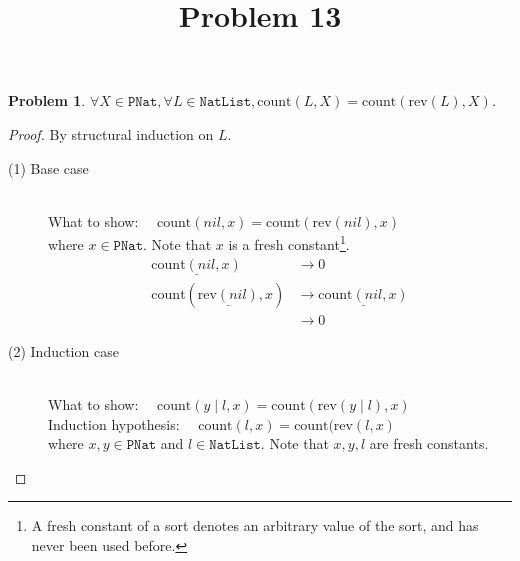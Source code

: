 \documentclass[12pt, a4paper]{article}
\title{Problem 13}
\date{\vspace{-5ex}}
\newtheorem{problem}{Problem}
\newcommand{\rmx}[1]{\mathrm{#1}}
\newcommand{\larrow}{\longrightarrow}
\newcommand{\under}{\underline}
\begin{document}
\maketitle

\begin{problem}
$\forall X \in \mathtt{PNat}, \forall L \in \mathtt{NatList}, \rmx{count}(L, X) = \rmx{count}(\rmx{rev}(L), X)$.
\end{problem}
\begin{proof}
By structural induction on $L$.
\begin{description}
\item[(1) Base case]~\\
\noindent
What to show: $\quad \rmx{count}(nil, x) = \rmx{count}(\rmx{rev}(nil), x)$\\
where $x \in \mathtt{PNat}$. Note that $x$ is a fresh constant\footnote{A fresh constant of a sort denotes an arbitrary value of the sort, and has never been used before.}.
\begin{align*}
\under{\rmx{count}(nil, x)} 
	&\larrow 0 \tag{by cnt1} \\
\rmx{count}(\under{\rmx{rev}(nil)}, x)
	&\larrow \under{\rmx{count}(nil, x)} \tag{by rev1} \\
	&\larrow 0 \tag{by cnt1}
\end{align*}

\item[(2) Induction case]~\\
What to show: $\quad \rmx{count}(y \mid l, x) = \rmx{count}(\rmx{rev}(y \mid l), x)$ \\
Induction hypothesis: $\quad \rmx{count}(l, x) = \rmx{count}(\rmx{rev}(l, x)$  \\
where $x,y \in \mathtt{PNat}$ and $l \in \mathtt{NatList}$.
Note that $x, y, l$ are fresh constants.


\end{description}
\end{proof}
\end{document}
